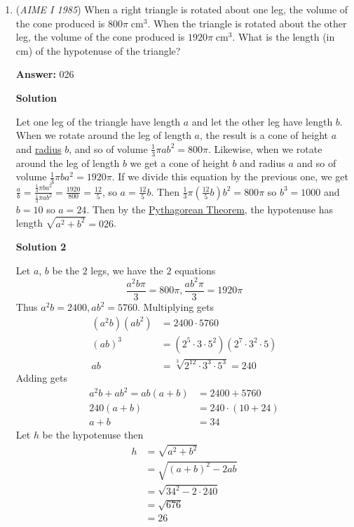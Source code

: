 \begin{enumerate}
	\item (\textit{AIME I 1985}) When a right triangle is rotated about one leg, the volume of the cone produced is $800\pi \;\textrm{cm}^3$. When the triangle is rotated about the other leg, the volume of the cone produced is $1920\pi \;\textrm{cm}^3$. What is the length (in cm) of the hypotenuse of the triangle?


 
 \textbf{Answer: }026



\textbf{Solution}

Let one leg of the triangle have length $a$ and let the other leg have length $b$.  When we rotate around the leg of length $a$, the result is a cone of height $a$ and \href{https://artofproblemsolving.com/wiki/index.php?title=Radius}{radius} $b$, and so of volume $\frac 13 \pi ab^2 = 800\pi$.  Likewise, when we rotate around the leg of length $b$ we get a cone of height $b$ and radius $a$ and so of volume $\frac13 \pi b a^2 = 1920 \pi$.  If we divide this equation by the previous one, we get $\frac ab = \frac{\frac13 \pi b a^2}{\frac 13 \pi ab^2} = \frac{1920}{800} = \frac{12}{5}$, so $a = \frac{12}{5}b$.  Then $\frac{1}{3} \pi \left(\frac{12}{5}b\right)b^2 = 800\pi$ so $b^3 = 1000$ and $b = 10$ so $a = 24$.  Then by the \href{https://artofproblemsolving.com/wiki/index.php?title=Pythagorean\_Theorem}{Pythagorean Theorem}, the hypotenuse has length $\sqrt{a^2 + b^2} = \boxed{026}$.

 


 



\textbf{Solution 2}

Let $a$, $b$ be the $2$ legs, we have the $2$ equations
 \[\frac{a^2b\pi}{3}=800\pi,\frac{ab^2\pi}{3}=1920\pi\]Thus $a^2b=2400, ab^2=5760$. Multiplying gets
 \begin{align*} (a^2b)(ab^2)&=2400\cdot5760\\ (ab)^3&=(2^5\cdot3\cdot5^2)(2^7\cdot3^2\cdot5)\\ ab&=\sqrt[3]{2^{12}\cdot3^3\cdot5^3}=240 \end{align*}
Adding gets
 \begin{align*} a^2b+ab^2=ab(a+b)&=2400+5760\\ 240(a+b)&=240\cdot(10+24)\\ a+b&=34 \end{align*}
Let $h$ be the hypotenuse then
 \begin{align*} h&=\sqrt{a^2+b^2}\\ &=\sqrt{(a+b)^2-2ab}\\ &=\sqrt{34^2-2\cdot240}\\ &=\sqrt{676}\\ &=\boxed{26} \end{align*}






\end{enumerate}
